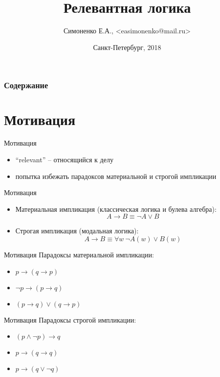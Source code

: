 \documentclass[14pt]{beamer}
\title[Релевантная логика]{Релевантная логика}
\author[]{Симоненко Е.А., <easimonenko@mail.ru>}
\institute[]{Университет ИТМО}
\date[]{Санкт-Петербург, 2018}
\begin{document}
\begin{darkbars}
    \begin{frame}
        \titlepage
    \end{frame}
\end{darkbars}

\begin{frame}
	\frametitle{Содержание}
	\tableofcontents
\end{frame}

\section{Мотивация}

\begin{frame}[nologo]{Мотивация}
	\begin{itemize}
		\item ``relevant'' -- относящийся к делу
		\item попытка избежать парадоксов материальной и строгой импликации
		
	\end{itemize}
\end{frame}

\begin{frame}[nologo]{Мотивация}
	\begin{itemize}
		\item Материальная импликация (классическая логика и булева алгебра): 
		\[ A \rightarrow B \equiv \neg A \vee B \]
		\item Строгая импликация (модальная логика): \[ A \rightarrow B \equiv 
		\forall w~\neg A(w) \vee B(w) \]
	\end{itemize}
\end{frame}

\begin{frame}[nologo]{Мотивация}
	Парадоксы материальной импликации:
	
	\begin{itemize}
		\item $ p \rightarrow (q \rightarrow p) $
		\item $ \neg p \rightarrow (p \rightarrow q) $
		\item $ (p \rightarrow q) \vee (q \rightarrow p) $
	\end{itemize}
\end{frame}

\begin{frame}[nologo]{Мотивация}
	Парадоксы строгой импликации:
	
	\begin{itemize}
		\item $ (p \wedge \neg p) \rightarrow q $
		\item $ p \rightarrow (q \rightarrow q) $
		\item $ p \rightarrow (q \vee \neg q) $
	\end{itemize}
\end{frame}
\end{document}
